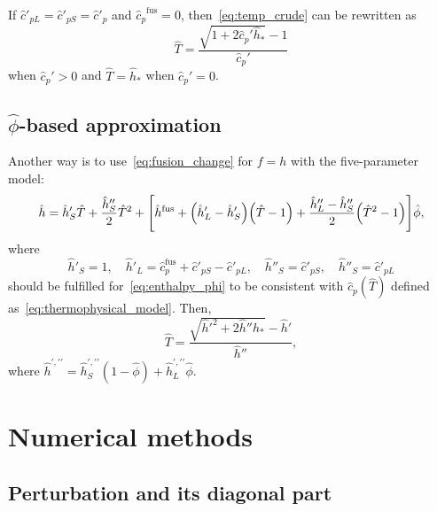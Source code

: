 \documentclass{article}
\newcommand{\fusion}[1]{{#1}^\mathrm{fus}}
\begin{document}
If \(\hat{c}'_{pL} = \hat{c}'_{pS} = \hat{c}'_p\) and \(\fusion{\hat{c}_{p}} = 0\),
then~\eqref{eq:temp_crude} can be rewritten as
\begin{equation}\label{eq:temp_crude2}
	\hat{T} = \frac{\sqrt{1+2\hat{c}_p'\hat{h}_*}-1}{\hat{c}_p'}
\end{equation}
when \(\hat{c}_p'>0\) and \(\hat{T} = \hat{h}_*\) when \(\hat{c}_p'=0\).

\subsection{\(\hat\phi\)-based approximation}

Another way is to use~\eqref{eq:fusion_change} for \(f=h\) with the five-parameter model:
\begin{equation}\label{eq:enthalpy_phi}
	\hat{h} = \hat{h}'_S\hat{T} + \frac{\hat{h}''_S}2\hat{T}^2 + \qty[
	    \fusion{\hat{h}} + \qty(\hat{h}'_L - \hat{h}'_S) \qty(\hat{T} - 1) +
	    \frac{\hat{h}''_L - \hat{h}''_S}2\qty( \hat{T}^2-1 )
	]\hat{\phi},
\end{equation}
where
\begin{equation}\label{eq:enthalpy_phi_params}
	\hat{h}'_S = 1, \quad \hat{h}'_L = \fusion{\hat{c}}_p + \hat{c}'_{pS} - \hat{c}'_{pL}, \quad
	\hat{h}''_S = \hat{c}'_{pS}, \quad \hat{h}''_S = \hat{c}'_{pL}
\end{equation}
should be fulfilled for~\eqref{eq:enthalpy_phi} to be consistent with \(\hat{c}_p(\hat{T})\)
defined as~\eqref{eq:thermophysical_model}. Then,
\begin{equation}\label{eq:temp_phi}
	\hat{T} = \frac{\sqrt{\hat{h}'^2 + 2\hat{h}''\hat{h}_*}-\hat{h}'}{\hat{h}''},
\end{equation}
where \(\hat{h}^{\prime,\prime\prime} = \hat{h}_S^{\prime,\prime\prime} (1-\hat\phi) + \hat{h}_L^{\prime,\prime\prime}\hat\phi\).

\section{Numerical methods}

\subsection{Perturbation and its diagonal part}
\end{document}
